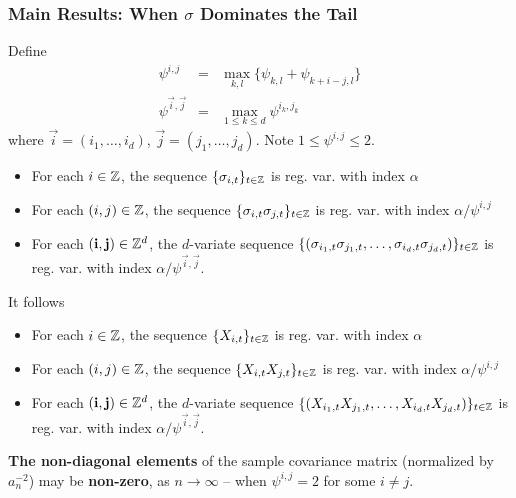 \documentclass{beamer}
\begin{document}
\begin{frame}
  \frametitle{Main Results: When $\sigma$ Dominates the Tail}
  Define
  \begin{eqnarray*}
    \psi^{i,j} &=& \max_{k,l}\{\psi_{k,l} + \psi_{k+i-j, l}\} \\
    \psi^{\vec i, \vec j}
    &=&
    \max_{1 \leq k \leq d} \psi^{i_k, j_k}
  \end{eqnarray*}
  where $\vec i = (i_1, \dots, i_d)$, $\vec j = (j_1, \dots, j_d)$.
  Note $1 \leq \psi^{i,j} \leq 2$.
  \begin{itemize}
  \item For each $i \in \mathbb Z$, the sequence
    $\{\sigma_{i,t}\}_{t \in \mathbb Z}$ is reg. var. with index $\alpha$
  \item For each $(i, j) \in \mathbb Z$, the sequence
    $\{\sigma_{i,t} \sigma_{j,t}\}_{t \in \mathbb Z}$ is
    reg. var. with index $\alpha/\psi^{i,j}$
  \item For each $(\mathbf{i}, \mathbf{j}) \in \mathbb Z^d$, the $d$-variate
    sequence
    $\{(\sigma_{i_1,t} \sigma_{j_1,t}, \dots, \sigma_{i_d,t} \sigma_{j_d,t})\}_{t \in \mathbb Z}$ is
    reg. var. with index $\alpha/\psi^{\vec i, \vec j}$.
  \end{itemize}
\end{frame}

\begin{frame}
  It follows
  \begin{itemize}
  \item For each $i \in \mathbb Z$, the sequence
    $\{X_{i,t}\}_{t \in \mathbb Z}$ is reg. var. with index $\alpha$
  \item For each $(i, j) \in \mathbb Z$, the sequence
    $\{X_{i,t} X_{j,t}\}_{t \in \mathbb Z}$ is
    reg. var. with index $\alpha/\psi^{i,j}$
  \item For each $(\mathbf{i}, \mathbf{j}) \in \mathbb Z^d$, the $d$-variate
    sequence
    $\{(X_{i_1,t} X_{j_1,t}, \dots, X_{i_d,t} X_{j_d,t})\}_{t \in \mathbb Z}$ is
    reg. var. with index $\alpha/\psi^{\vec i, \vec j}$.
  \end{itemize}
  {\bf The non-diagonal elements} of the sample covariance
    matrix (normalized by $a_n^{-2}$) may be {\bf non-zero}, as
    $n \to \infty$ -- when $\psi^{i,j} = 2$ for some $i \neq j$.
\end{frame}
\end{document}
